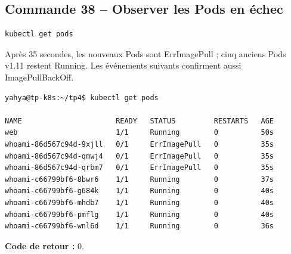 \documentclass[11pt,a4paper]{article}
\begin{document}
\subsection{Commande 38 -- Observer les Pods en échec}
\begin{lstlisting}
kubectl get pods
\end{lstlisting}
Après 35 secondes, les nouveaux Pods sont ErrImagePull ; cinq anciens Pods v1.11 restent Running. Les événements suivants confirment aussi ImagePullBackOff.
\begin{tcolorbox}[terminal,title={Ubuntu / WSL2 -- Commande 38 -- rendu reconstitué}]
\begin{Verbatim}[fontsize=\scriptsize,breaklines=true,breakanywhere=true,breaksymbolleft={},breaksymbolright={}]
yahya@tp-k8s:~/tp4$ kubectl get pods

NAME                      READY   STATUS         RESTARTS   AGE
web                       1/1     Running        0          50s
whoami-86d567c94d-9xjll   0/1     ErrImagePull   0          35s
whoami-86d567c94d-qmwj4   0/1     ErrImagePull   0          35s
whoami-86d567c94d-qrbm7   0/1     ErrImagePull   0          35s
whoami-c66799bf6-8bwr6    1/1     Running        0          37s
whoami-c66799bf6-g684k    1/1     Running        0          40s
whoami-c66799bf6-mhdb7    1/1     Running        0          40s
whoami-c66799bf6-pmflg    1/1     Running        0          40s
whoami-c66799bf6-wnl6d    1/1     Running        0          36s
\end{Verbatim}
\end{tcolorbox}
\textbf{Code de retour :} 0.
\end{document}
